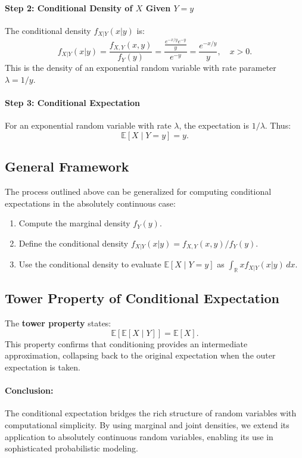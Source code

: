 \paragraph{Step 2: Conditional Density of \( X \) Given \( Y=y \)}
The conditional density \( f_{X|Y}(x|y) \) is:
\[
f_{X|Y}(x|y) = \frac{f_{X,Y}(x,y)}{f_Y(y)} = \frac{\frac{e^{-x/y} e^{-y}}{y}}{e^{-y}} = \frac{e^{-x/y}}{y}, \quad x > 0.
\]
This is the density of an exponential random variable with rate parameter \( \lambda = 1/y \).

\paragraph{Step 3: Conditional Expectation}
For an exponential random variable with rate \( \lambda \), the expectation is \( 1/\lambda \). Thus:
\[
\mathbb{E}[X \mid Y=y] = y.
\]

\subsection{General Framework}
The process outlined above can be generalized for computing conditional expectations in the absolutely continuous case:
\begin{enumerate}
    \item Compute the marginal density \( f_Y(y) \).
    \item Define the conditional density \( f_{X|Y}(x|y) = f_{X,Y}(x,y) / f_Y(y) \).
    \item Use the conditional density to evaluate \( \mathbb{E}[X \mid Y=y] \) as \( \int_{\mathbb{R}} x f_{X|Y}(x|y) \, dx \).
\end{enumerate}

\subsection{Tower Property of Conditional Expectation}
The \textbf{tower property} states:
\[
\mathbb{E}[\mathbb{E}[X \mid Y]] = \mathbb{E}[X].
\]
This property confirms that conditioning provides an intermediate approximation, collapsing back to the original expectation when the outer expectation is taken.

\paragraph{Conclusion:}
The conditional expectation bridges the rich structure of random variables with computational simplicity. By using marginal and joint densities, we extend its application to absolutely continuous random variables, enabling its use in sophisticated probabilistic modeling.

